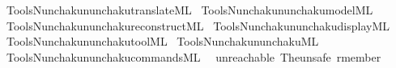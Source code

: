 \begin{isabellebody}
\isamarkupfalse%
\ {\isacartoucheopen}Tools{\isacharslash}{\kern0pt}Nunchaku{\isacharslash}{\kern0pt}nunchaku{\isacharunderscore}{\kern0pt}translate{\isachardot}{\kern0pt}ML{\isacartoucheclose}\isanewline
{}\isamarkupfalse%
\ {\isacartoucheopen}Tools{\isacharslash}{\kern0pt}Nunchaku{\isacharslash}{\kern0pt}nunchaku{\isacharunderscore}{\kern0pt}model{\isachardot}{\kern0pt}ML{\isacartoucheclose}\isanewline
{}\isamarkupfalse%
\ {\isacartoucheopen}Tools{\isacharslash}{\kern0pt}Nunchaku{\isacharslash}{\kern0pt}nunchaku{\isacharunderscore}{\kern0pt}reconstruct{\isachardot}{\kern0pt}ML{\isacartoucheclose}\isanewline
{}\isamarkupfalse%
\ {\isacartoucheopen}Tools{\isacharslash}{\kern0pt}Nunchaku{\isacharslash}{\kern0pt}nunchaku{\isacharunderscore}{\kern0pt}display{\isachardot}{\kern0pt}ML{\isacartoucheclose}\isanewline
{}\isamarkupfalse%
\ {\isacartoucheopen}Tools{\isacharslash}{\kern0pt}Nunchaku{\isacharslash}{\kern0pt}nunchaku{\isacharunderscore}{\kern0pt}tool{\isachardot}{\kern0pt}ML{\isacartoucheclose}\isanewline
{}\isamarkupfalse%
\ {\isacartoucheopen}Tools{\isacharslash}{\kern0pt}Nunchaku{\isacharslash}{\kern0pt}nunchaku{\isachardot}{\kern0pt}ML{\isacartoucheclose}\isanewline
{}\isamarkupfalse%
\ {\isacartoucheopen}Tools{\isacharslash}{\kern0pt}Nunchaku{\isacharslash}{\kern0pt}nunchaku{\isacharunderscore}{\kern0pt}commands{\isachardot}{\kern0pt}ML{\isacartoucheclose}%
\endisatagML
{\isafoldML}%
%
\isadelimML
\isanewline
%
\endisadelimML
\isanewline
{}\isamarkupfalse%
\ {\isacharparenleft}{\kern0pt}\ unreachable\ The{\isacharunderscore}{\kern0pt}unsafe\ rmember\isanewline
%
\isadelimtheory
\isanewline
%
\endisadelimtheory
%
\isatagtheory
{}\isamarkupfalse%
%
\endisatagtheory
{\isafoldtheory}%
%
\isadelimtheory
%
\endisadelimtheory
%
\end{isabellebody}%
\endinput
